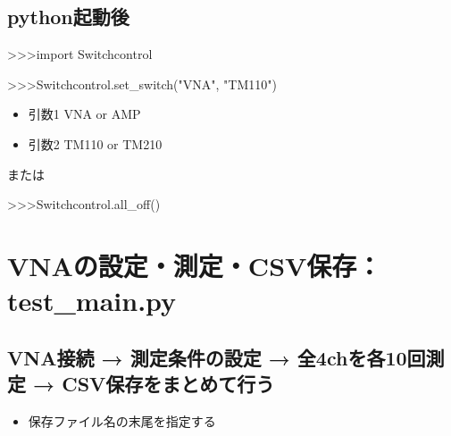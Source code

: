 \documentclass[a4paper,11pt]{ltjsarticle}
\begin{document}
\subsection{python起動後}

\begin{command}

>>>import Switchcontrol

>>>Switchcontrol.set_switch("VNA", "TM110")

\end{command}

\begin{itemize}

\item 引数1 VNA or AMP

\item 引数2 TM110 or TM210

\end{itemize}

または


\begin{command}

>>>Switchcontrol.all_off()

\end{command}

\section{VNAの設定・測定・CSV保存：test\_main.py}

\subsection{VNA接続 → 測定条件の設定 → 全4chを各10回測定 → CSV保存をまとめて行う}

\begin{command}


\end{command}

\begin{itemize}

\item 保存ファイル名の末尾を指定する

\begin{command}


\end{command}

\end{itemize}
\end{document}
